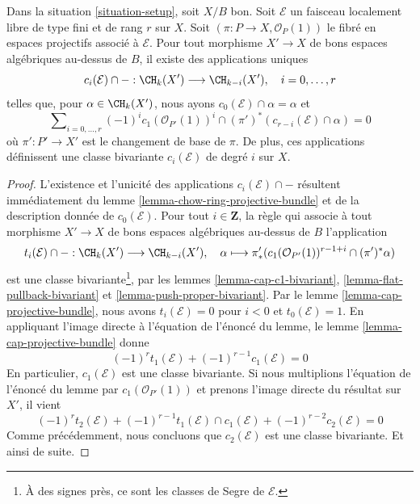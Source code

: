 \begin{lemma}
\label{lemma-segre-classes}
Dans la situation \ref{situation-setup}, soit $X/B$ bon. Soit $\mathcal{E}$ un
faisceau localement libre de type fini et de rang $r$ sur $X$. Soit
$(\pi : P \to X, \mathcal{O}_P(1))$ le fibré en espaces projectifs associé à
$\mathcal{E}$. Pour tout morphisme $X' \to X$ de bons espaces algébriques
au-dessus de $B$, il existe des applications uniques
$$
c_i(\mathcal{E}) \cap - : \CH_k(X') \longrightarrow \CH_{k - i}(X'),\quad
i = 0, \ldots, r
$$
telles que, pour $\alpha \in \CH_k(X')$, nous ayons $c_0(\mathcal{E}) \cap
\alpha = \alpha$ et
$$
\sum\nolimits_{i = 0, \ldots, r}
(-1)^i c_1(\mathcal{O}_{P'}(1))^i \cap
(\pi')^*\left(c_{r - i}(\mathcal{E}) \cap \alpha\right) = 0
$$
où $\pi' : P' \to X'$ est le changement de base de $\pi$. De plus, ces applications
définissent une classe bivariante $c_i(\mathcal{E})$ de degré $i$ sur $X$.
\end{lemma}

\begin{proof}
L'existence et l'unicité des applications $c_i(\mathcal{E}) \cap -$ résultent
immédiatement du lemme \ref{lemma-chow-ring-projective-bundle} et de la
description donnée de $c_0(\mathcal{E})$. Pour tout $i \in \mathbf{Z}$, la
règle qui associe à tout morphisme $X' \to X$ de bons espaces algébriques
au-dessus de $B$ l'application
$$
t_i(\mathcal{E}) \cap - :
\CH_k(X') \longrightarrow \CH_{k - i}(X'),\quad
\alpha \longmapsto
\pi'_*(c_1(\mathcal{O}_{P'}(1))^{r - 1 + i} \cap (\pi')^*\alpha)
$$
est une classe bivariante\footnote{À des signes près, ce sont les classes de
Segre de $\mathcal{E}$.}, par les lemmes \ref{lemma-cap-c1-bivariant},
\ref{lemma-flat-pullback-bivariant} et \ref{lemma-push-proper-bivariant}. Par le
lemme \ref{lemma-cap-projective-bundle}, nous avons $t_i(\mathcal{E}) = 0$ pour
$i < 0$ et $t_0(\mathcal{E}) = 1$. En appliquant l'image directe à l'équation
de l'énoncé du lemme, le lemme \ref{lemma-cap-projective-bundle} donne
$$
(-1)^r t_1(\mathcal{E}) + (-1)^{r - 1}c_1(\mathcal{E}) = 0
$$
En particulier, $c_1(\mathcal{E})$ est une classe bivariante. Si nous
multiplions l'équation de l'énoncé du lemme par
$c_1(\mathcal{O}_{P'}(1))$ et prenons l'image directe du résultat sur $X'$, il
vient
$$
(-1)^r t_2(\mathcal{E}) +
(-1)^{r - 1} t_1(\mathcal{E}) \cap c_1(\mathcal{E}) +
(-1)^{r - 2} c_2(\mathcal{E}) = 0
$$
Comme précédemment, nous concluons que $c_2(\mathcal{E})$ est une classe
bivariante. Et ainsi de suite.
\end{proof}

